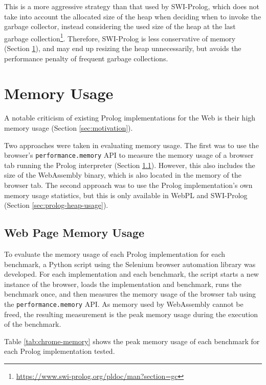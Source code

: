 This is a more aggressive strategy than that used by SWI-Prolog, which does not take into account the allocated size of the heap when deciding when to invoke the garbage collector, instead considering the used size of the heap at the last garbage collection\footnote{\url{https://www.swi-prolog.org/pldoc/man?section=gc}}. Therefore, SWI-Prolog is less conservative of memory (Section \ref{sec:memory-usage}), and may end up resizing the heap unnecessarily, but avoids the performance penalty of frequent garbage collections.

\section{Memory Usage}

\label{sec:memory-usage}

A notable criticism of existing Prolog implementations for the Web is their high memory usage (Section \ref{sec:motivation}).

Two approaches were taken in evaluating memory usage. The first was to use the browser's \texttt{performance.memory} API to measure the memory usage of a browser tab running the Prolog interpreter (Section \ref{sec:web-page-memory-usage}). However, this also includes the size of the WebAssembly binary, which is also located in the memory of the browser tab. The second approach was to use the Prolog implementation's own memory usage statistics, but this is only available in WebPL and SWI-Prolog (Section \ref{sec:prolog-heap-usage}).

\subsection{Web Page Memory Usage}

\label{sec:web-page-memory-usage}

To evaluate the memory usage of each Prolog implementation for each benchmark, a Python script using the Selenium browser automation library was developed. For each implementation and each benchmark, the script starts a new instance of the browser, loads the implementation and benchmark, runs the benchmark once, and then measures the memory usage of the browser tab using the \texttt{performance.memory} API. As memory used by WebAssembly cannot be freed, the resulting measurement is the peak memory usage during the execution of the benchmark.

Table \ref{tab:chrome-memory} shows the peak memory usage of each benchmark for each Prolog implementation tested.

